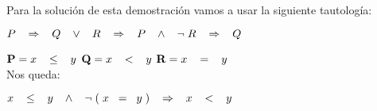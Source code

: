 \documentclass[12pt]{article}
\begin{document}
Para la solución de esta demostración vamos a usar la siguiente tautología: \\

\begin{center}
    $P\hspace{0.3cm}\Rightarrow \hspace{0.3cm}Q \hspace{0.3cm}\vee\hspace{0.3cm} R \hspace{0.3cm}\Rightarrow\hspace{0.3cm} P \hspace{0.3cm}\wedge\hspace{0.3cm} \neg \hspace{0.1cm} R\hspace{0.3cm} \Rightarrow \hspace{0.3cm}Q$
\end{center}
\vspace{0.2cm} 

\hspace{0.7cm} $\textbf{P}=x \hspace{0.3cm} \leq \hspace{0.3cm} y$\hspace{0.4cm} $\textbf{Q}=x \hspace{0.3cm} < \hspace{0.3cm} y$ \hspace{0.4cm} $\textbf{R}=x \hspace{0.3cm} = \hspace{0.3cm} y$\\

Nos queda: 

\begin{center}
    $x \hspace{0.3cm} \leq \hspace{0.3cm} y \hspace{0.3cm} \wedge \hspace{0.3cm}  \neg \hspace{0.1cm} (\hspace{0.1cm}x\hspace{0.2cm}=\hspace{0.2cm}y\hspace{0.1cm}) \hspace{0.3cm} \Rightarrow \hspace{0.3cm} x\hspace{0.3cm}<\hspace{0.3cm}y$
\end{center} \vspace{2cm} 
\end{document}

